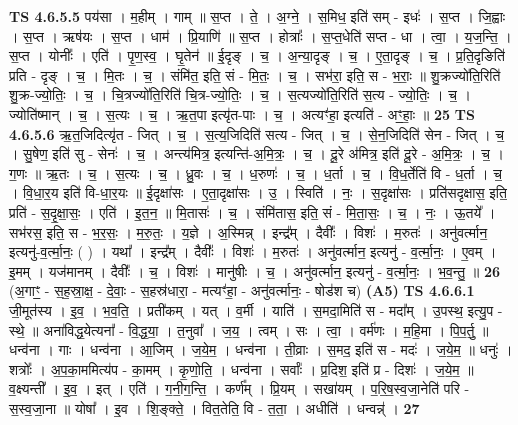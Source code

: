 \documentclass[17pt]{extarticle}
\begin{document}
                  \newline
                                \textbf{ TS 4.6.5.5} \newline
                  पय॑सा । म॒हीम् । गाम् ॥ स॒प्त । ते॒ । अ॒ग्ने॒ । स॒मिध॒ इति॑ सम् - इधः॑ । स॒प्त । जि॒ह्वाः । स॒प्त । ऋष॑यः । स॒प्त । धाम॑ । प्रि॒याणि॑ ॥ स॒प्त । होत्राः᳚ । स॒प्त॒धेति॑ सप्त - धा । त्वा॒ । य॒ज॒न्ति॒ । स॒प्त । योनीः᳚ । एति॑ । पृ॒ण॒स्व॒ । घृ॒तेन॑ ॥ ई॒दृङ् । च॒ । अ॒न्या॒दृङ् । च॒ । ए॒ता॒दृङ् । च॒ । प्र॒ति॒दृङिति॑ प्रति - दृङ् । च॒ । मि॒तः । च॒ । संमि॑त॒ इति॒ सं - मि॒तः॒ । च॒ । सभ॑रा॒ इति॒ स - भ॒राः॒ ॥ शु॒क्रज्यो॑ति॒रिति॑ शु॒क्र-ज्यो॒तिः॒ । च॒ । चि॒त्रज्यो॑ति॒रिति॑ चि॒त्र-ज्यो॒तिः॒ । च॒ । स॒त्यज्यो॑ति॒रिति॑ स॒त्य - ज्यो॒तिः॒ । च॒ । ज्योति॑ष्मान् । च॒ । स॒त्यः । च॒ । ऋ॒त॒पा इत्यृ॑त-पाः । च॒ । अत्यꣳ॑हा॒ इत्यति॑ - अꣳ॒॒हाः॒ ॥ \textbf{  25} \newline
                  \newline
                                \textbf{ TS 4.6.5.6} \newline
                  ऋ॒त॒जिदित्यृ॑त - जित् । च॒ । स॒त्य॒जिदिति॑ सत्य - जित् । च॒ । से॒न॒जिदिति॑ सेन - जित् । च॒ । सु॒षेण॒ इति॑ सु - सेनः॑ । च॒ । अन्त्य॑मित्र॒ इत्यन्ति॑-अ॒मि॒त्रः॒ । च॒ । दू॒रे अ॑मित्र॒ इति॑ दू॒रे - अ॒मि॒त्रः॒ । च॒ । ग॒णः ॥ ऋ॒तः । च॒ । स॒त्यः । च॒ । ध्रु॒वः । च॒ । ध॒रुणः॑ । च॒ । ध॒र्ता । च॒ । वि॒ध॒र्तेति॑ वि - ध॒र्ता । च॒ । वि॒धा॒र॒य इति॑ वि-धा॒र॒यः ॥ ई॒दृक्षा॑सः । ए॒ता॒दृक्षा॑सः । उ॒ । स्विति॑ । नः॒ । स॒दृक्षा॑सः । प्रति॑सदृक्षास॒ इति॒ प्रति॑ - स॒दृ॒क्षा॒सः॒ । एति॑ । इ॒त॒न॒ ॥ मि॒तासः॑ । च॒ । संमि॑तास॒ इति॒ सं - मि॒ता॒सः॒ । च॒ । नः॒ । ऊ॒तये᳚ । सभ॑रस॒ इति॒ स - भ॒र॒सः॒ । म॒रु॒तः॒ । य॒ज्ञे । अ॒स्मिन्न् । इन्द्र᳚म् । दैवीः᳚ । विशः॑ । म॒रुतः॑ । अनु॑वर्त्मान॒ इत्यनु॑-व॒र्त्मा॒नः॒ ( ) । यथा᳚ । इन्द्र᳚म् । दैवीः᳚ । विशः॑ । म॒रुतः॑ । अनु॑वर्त्मान॒ इत्यनु॑ - व॒र्त्मा॒नः॒ । ए॒वम् । इ॒मम् । यज॑मानम् । दैवीः᳚ । च॒ । विशः॑ । मानु॑षीः । च॒ । अनु॑वर्त्मान॒ इत्यनु॑ - व॒र्त्मा॒नः॒ । भ॒व॒न्तु॒ ॥ \textbf{  26} \newline
                  \newline
                      (अ॒गाꣳ॒॒ - स॒ह॒स्रा॒क्ष॒ - दे॒वाः॒ - स॒हस्र॑धारा॒ - मत्यꣳ॑हा॒ - अनु॑वर्त्मानः॒ - षोड॑श च)  \textbf{(A5)} \newline \newline
                                \textbf{ TS 4.6.6.1} \newline
                  जी॒मूत॑स्य । इ॒व॒ । भ॒व॒ति॒ । प्रती॑कम् । यत् । व॒र्मी । याति॑ । स॒मदा॒मिति॑ स - मदा᳚म् । उ॒पस्थ॒ इत्यु॒प - स्थे॒ ॥ अना॑विद्ध॒येत्यना᳚ - वि॒द्ध॒या॒ । त॒नुवा᳚ । ज॒य॒ । त्वम् । सः । त्वा॒ । वर्म॑णः । म॒हि॒मा । पि॒प॒र्तु॒ ॥ धन्व॑ना । गाः । धन्व॑ना । आ॒जिम् । ज॒ये॒म॒ । धन्व॑ना । ती॒व्राः । स॒मद॒ इति॑ स - मदः॑ । ज॒ये॒म॒ ॥ धनुः॑ । शत्रोः᳚ । अ॒प॒का॒ममित्य॑प - का॒मम् । कृ॒णो॒ति॒ । धन्व॑ना । सर्वाः᳚ । प्र॒दिश॒ इति॑ प्र - दिशः॑ । ज॒ये॒म॒ ॥ व॒क्ष्यन्ती᳚ । इ॒व॒ । इत् । एति॑ । ग॒नी॒ग॒न्ति॒ । कर्ण᳚म् । प्रि॒यम् । सखा॑यम् । प॒रि॒ष॒स्व॒जा॒नेति॑ परि - स॒स्व॒जा॒ना ॥ योषा᳚ । इ॒व । शि॒ङ्क्ते॒ । वित॒तेति॒ वि - त॒ता॒ । अधीति॑ । धन्वन्न्॑ । \textbf{  27} \newline
\end{document}
